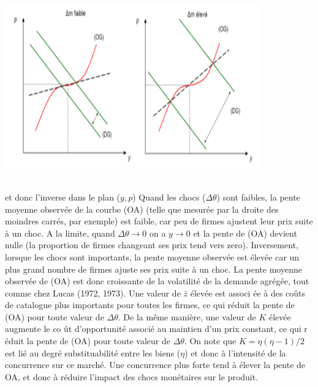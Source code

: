 \documentclass[11pt,a4paper]{article}
\begin{document}
\begin{enumerate}
\begin{center}
\includegraphics[width=11cm, height=8cm]{3.png}
\end{center}


\bigskip
et donc l'inverse dans le plan ($y,p$)\bigskip \newline
Quand les chocs ($\Delta \theta$) sont faibles, la pente moyenne observ\'{e}e de
la courbe (OA) (telle que mesur\'{e}e par la droite des moindres carr\'{e}s,
par exemple) est faible, car peu de firmes ajustent leur prix suite \`{a} un
choc. A la limite, quand $\Delta \theta\rightarrow 0$ on a $y\rightarrow 0$ et la
pente de (OA) devient nulle (la proportion de firmes changeant ses prix tend
vers zero). Inversement, lorsque les chocs sont importants, la pente moyenne
observ\'{e}e est \'{e}lev\'{e}e car un plus grand nombre de firmes ajuste
ses prix suite \`{a} un choc. La pente moyenne observ\'{e}e de (OA) est donc
croissante de la volatilit\'{e} de la demande agr\'{e}g\'{e}e, tout comme
chez Lucas (1972, 1973). Une valeur de $\bar{z}$ \'{e}lev\'{e}e est associ%
\'{e}e \`{a} des co\^{u}ts de catalogue plus importants pour toutes les
firmes, ce qui r\'{e}duit la pente de (OA) pour toute valeur de $\Delta \theta $.
De la m\^{e}me mani\`{e}re, une valeur de $K$ \'{e}lev\'{e}e augmente le co%
\^{u}t d'opportunit\'{e} associ\'{e} au maintien d'un prix constant, ce qui r%
\'{e}duit la pente de (OA) pour toute valeur de $\Delta \theta$. On note que $%
K=\eta \left( \eta -1\right) /2$ est li\'{e} au degr\'{e} substituabilit\'{e}
entre les biens ($\eta $) et donc \`{a} l'intensit\'{e} de la concurrence
sur ce march\'{e}. Une concurrence plus forte tend \`{a} \'{e}lever la pente
de OA, et donc \`{a} r\'{e}duire l'impact des chocs mon\'{e}taires sur le
produit.\newline






\end{enumerate}
\end{document}
